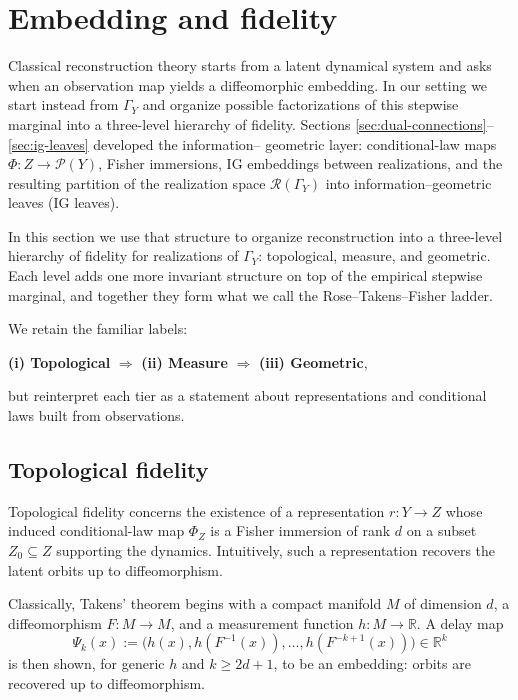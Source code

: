 \documentclass[11pt]{article}
\newcommand{\1}{\mathbf{1}}
\begin{document}
\newpage
\section{Embedding and fidelity}
\label{sec:embedding-fidelity}

Classical reconstruction theory starts from a latent dynamical system and asks when an observation map yields a diffeomorphic embedding. In our setting we start instead from $\Gamma_Y$ and organize possible factorizations of this stepwise marginal into a three-level hierarchy of fidelity. Sections \ref{sec:dual-connections}–\ref{sec:ig-leaves} developed the information– geometric layer: conditional-law maps $\Phi : Z \to \mathcal P(Y)$, Fisher immersions, IG embeddings between realizations, and the resulting partition of the realization space $\mathcal R(\Gamma_Y)$ into information–geometric leaves (IG leaves).

In this section we use that structure to organize reconstruction into a three-level hierarchy of fidelity for realizations of $\Gamma_Y$: topological, measure, and geometric. Each level adds one more invariant structure on top of the empirical stepwise marginal, and together they form what we call the Rose--Takens--Fisher ladder. 

We retain the familiar labels:
\begin{center}
\textbf{(i) Topological} $\Rightarrow$ \textbf{(ii) Measure} $\Rightarrow$ \textbf{(iii) Geometric},
\end{center}
but reinterpret each tier as a statement about representations and conditional laws built from observations.

\subsection{Topological fidelity}

Topological fidelity concerns the existence of a representation $r:Y\to Z$ whose induced conditional-law map $\Phi_Z$ is a Fisher immersion of rank $d$ on a subset $Z_0\subseteq Z$ supporting the dynamics. Intuitively, such a representation recovers the latent orbits up to diffeomorphism.

Classically, Takens' theorem begins with a compact manifold $M$ of dimension $d$, a diffeomorphism $F:M\to M$, and a measurement function $h:M\to\mathbb R$. A delay map
\[
  \Psi_k(x)
  := \big(h(x),h(F^{-1}(x)),\dots,h(F^{-k+1}(x))\big)\in\mathbb R^k
\]
is then shown, for generic $h$ and $k\ge 2d+1$, to be an embedding: orbits are recovered up to diffeomorphism.
\end{document}
